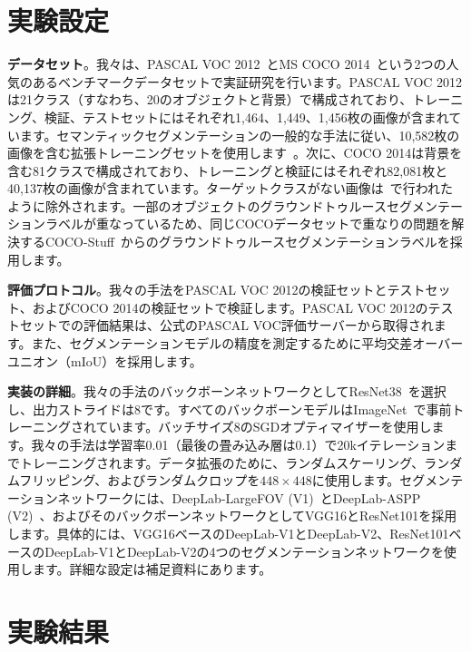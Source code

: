 \documentclass[final]{cvpr}
\begin{document}
\section{実験設定}
\noindent
\textbf{データセット}。我々は、PASCAL VOC 2012~\cite{everingham2015pascal}とMS COCO 2014~\cite{lin2014microsoft}という2つの人気のあるベンチマークデータセットで実証研究を行います。PASCAL VOC 2012は21クラス（すなわち、20のオブジェクトと背景）で構成されており、トレーニング、検証、テストセットにはそれぞれ1,464、1,449、1,456枚の画像が含まれています。セマンティックセグメンテーションの一般的な手法に従い、10,582枚の画像を含む拡張トレーニングセットを使用します~\cite{hariharan2011semantic}。次に、COCO 2014は背景を含む81クラスで構成されており、トレーニングと検証にはそれぞれ82,081枚と40,137枚の画像が含まれています。ターゲットクラスがない画像は~\cite{choe2020attention}で行われたように除外されます。一部のオブジェクトのグラウンドトゥルースセグメンテーションラベルが重なっているため、同じCOCOデータセットで重なりの問題を解決するCOCO-Stuff~\cite{caesar2018coco}からのグラウンドトゥルースセグメンテーションラベルを採用します。

\vspace{0.5mm}
\noindent
\textbf{評価プロトコル}。我々の手法をPASCAL VOC 2012の検証セットとテストセット、およびCOCO 2014の検証セットで検証します。PASCAL VOC 2012のテストセットでの評価結果は、公式のPASCAL VOC評価サーバーから取得されます。また、セグメンテーションモデルの精度を測定するために平均交差オーバーユニオン（mIoU）を採用します。

\vspace{0.5mm}
\noindent
\textbf{実装の詳細}。我々の手法のバックボーンネットワークとしてResNet38~\cite{wu2019wider}を選択し、出力ストライドは8です。すべてのバックボーンモデルはImageNet~\cite{deng2009imagenet}で事前トレーニングされています。バッチサイズ8のSGDオプティマイザーを使用します。我々の手法は学習率0.01（最後の畳み込み層は0.1）で20kイテレーションまでトレーニングされます。データ拡張のために、ランダムスケーリング、ランダムフリッピング、およびランダムクロップを$448 \times 448$に使用します。セグメンテーションネットワークには、DeepLab-LargeFOV (V1)~\cite{chen2014semantic}とDeepLab-ASPP (V2)~\cite{chen2017deeplab}、およびそのバックボーンネットワークとしてVGG16とResNet101を採用します。具体的には、VGG16ベースのDeepLab-V1とDeepLab-V2、ResNet101ベースのDeepLab-V1とDeepLab-V2の4つのセグメンテーションネットワークを使用します。詳細な設定は補足資料にあります。

\section{実験結果}
\end{document}
